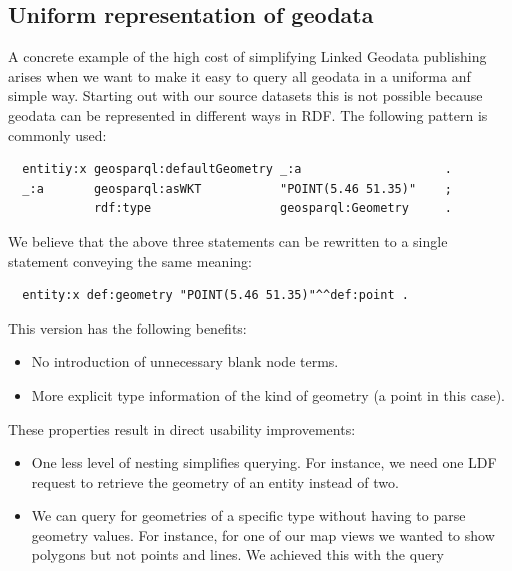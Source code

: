 \documentclass[a4paper]{scrartcl}
\begin{document}
\subsection{Uniform representation of geodata}

A concrete example of the high cost of simplifying Linked Geodata
publishing arises when we want to make it easy to query all geodata in
a uniforma anf simple way.  Starting out with our source datasets this
is not possible because geodata can be represented in different ways
in RDF.  The following pattern is commonly used:

\begin{verbatim}
  entitiy:x geosparql:defaultGeometry _:a                    .
  _:a       geosparql:asWKT           "POINT(5.46 51.35)"    ;
            rdf:type                  geosparql:Geometry     .
\end{verbatim}

We believe that the above three statements can be rewritten to a
single statement conveying the same meaning:

\begin{verbatim}
  entity:x def:geometry "POINT(5.46 51.35)"^^def:point .
\end{verbatim}

This version has the following benefits:

\begin{itemize}

\item No introduction of unnecessary blank node terms.

\item More explicit type information of the kind of geometry (a point
  in this case).

\end{itemize}

These properties result in direct usability improvements:

\begin{itemize}
  
\item One less level of nesting simplifies querying.  For instance, we
  need one LDF request to retrieve the geometry of an entity instead
  of two.

\item We can query for geometries of a specific type without having to
  parse geometry values.  For instance, for one of our map views we
  wanted to show polygons but not points and lines.  We achieved this
  with the query%

\end{itemize}
\end{document}

